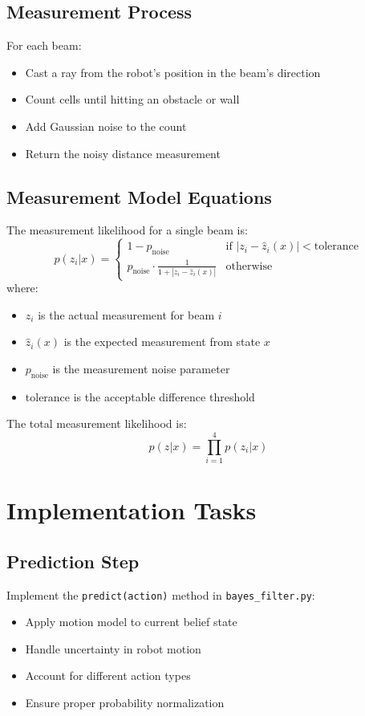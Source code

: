\documentclass[11pt]{article}
\begin{document}
\subsection{Measurement Process}
For each beam:
\begin{itemize}
    \item Cast a ray from the robot's position in the beam's direction
    \item Count cells until hitting an obstacle or wall
    \item Add Gaussian noise to the count
    \item Return the noisy distance measurement
\end{itemize}

\subsection{Measurement Model Equations}
The measurement likelihood for a single beam is:
\[
p(z_i|x) = \begin{cases}
1-p_{\text{noise}} & \text{if } |z_i - \hat{z}_i(x)| < \text{tolerance} \\
p_{\text{noise}} \cdot \frac{1}{1 + |z_i - \hat{z}_i(x)|} & \text{otherwise}
\end{cases}
\]
where:
\begin{itemize}
    \item $z_i$ is the actual measurement for beam $i$
    \item $\hat{z}_i(x)$ is the expected measurement from state $x$
    \item $p_{\text{noise}}$ is the measurement noise parameter
    \item tolerance is the acceptable difference threshold
\end{itemize}

The total measurement likelihood is:
\[
p(z|x) = \prod_{i=1}^4 p(z_i|x)
\]

\section{Implementation Tasks}

\subsection{Prediction Step}
Implement the \texttt{predict(action)} method in \texttt{bayes\_filter.py}:
\begin{itemize}
    \item Apply motion model to current belief state
    \item Handle uncertainty in robot motion
    \item Account for different action types
    \item Ensure proper probability normalization
\end{itemize}
\end{document}
